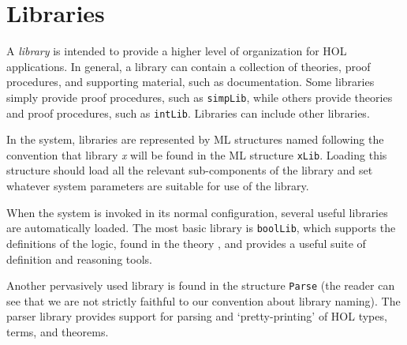 \chapter{Libraries}\label{HOLlibraries}

\newcommand{\simpset}{simpset}

{
 \newcommand{\term}      {\mbox{\it term}}
 \newcommand{\IMP}       {\mbox{\tt ==>}}
 \newcommand{\ALL}       {\mbox{\tt !}}
 \newcommand{\EXISTS}    {\mbox{\tt ?}}
 \newcommand{\CHOOSE}    {\mbox{\tt @}}
 \newcommand{\EXISTSONE} {\mbox{\tt ?!}}
 \newcommand{\LET}       {\mbox{\tt let}}
 \newcommand{\und}       {\mbox{\tt and}}
 \newcommand{\IN}        {\mbox{\tt in}}
 \newcommand{\CONS}      {\mbox{\tt CONS}}
 \newcommand{\INSERT}    {\mbox{\tt INSERT}}
 \newcommand{\SUC}       {\mbox{\tt SUC}}
 \newcommand{\vstr}      {\mbox{\it vstr}}
 \newcommand{\numeral}   {\mbox{\it numeral}}
 \newcommand{\charseq}   {\mbox{\it charseq}}

A \emph{library} is intended to provide a higher level of
organization for HOL applications. In general, a library
can contain a collection of theories, proof procedures,
and supporting material, such as documentation. Some libraries
simply provide proof procedures, such as {\small\verb+simpLib+},
while others provide theories and proof procedures, such as
{\small\verb+intLib+}. Libraries can include other libraries.

In the \HOL{} system, libraries are represented by ML structures named
following the convention that library \emph{x} will be found in the ML
structure {\small\verb+xLib+}. Loading this structure should load all
the relevant sub-components of the library and set whatever system
parameters are suitable for use of the library.

When the \HOL{} system is invoked in its normal configuration, several
useful libraries are automatically loaded. The most basic \HOL{}
library is {\small\verb+boolLib+}, which supports the definitions of
the \HOL{} logic, found in the theory , and provides a
useful suite of definition and reasoning tools.

Another pervasively used library is found in the structure
{\small\verb+Parse+} (the reader can see that we are not strictly
faithful to our convention about library naming). The parser library
provides support for parsing and `pretty-printing' of HOL types,
terms, and theorems.

}
